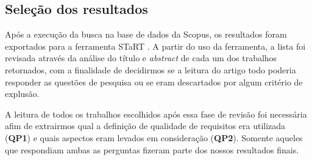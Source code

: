 \subsection{Seleção dos resultados}

Após a execução da busca na base de dados da Scopus, os resultados foram exportados para a ferramenta STaRT \cite{Start_2012}. A partir do uso da ferramenta, a lista foi revisada através da análise do título e \textit{abstract} de cada um dos trabalhos retornados, com a finalidade de decidirmos se a leitura do artigo todo poderia responder as questões de pesquisa ou se eram descartados por algum critério de explusão.

A leitura de todos os trabalhos escolhidos após essa fase de revisão foi necessária afim de extrairmos qual a definição de qualidade de requisitos era utilizada (\textbf{QP1}) e quais aspectos eram levados em consideração (\textbf{QP2}). Somente aqueles que respondiam ambas as perguntas fizeram parte dos nossos resultados finais.